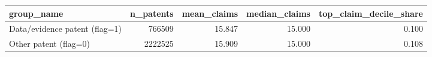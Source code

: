\begin{tabular}{lrrrr}
\toprule
group_name & n_patents & mean_claims & median_claims & top_claim_decile_share \\
\midrule
Data/evidence patent (flag=1) & 766509 & 15.847 & 15.000 & 0.100 \\
Other patent (flag=0) & 2222525 & 15.909 & 15.000 & 0.108 \\
\bottomrule
\end{tabular}
